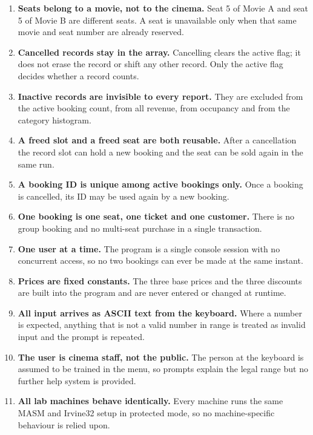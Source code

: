 \documentclass{thesis-library}
\begin{document}
\begin{enumerate}
\item \textbf{Seats belong to a movie, not to the cinema.} Seat 5 of Movie A and seat 5 of Movie B are different seats. A seat is unavailable only when that same movie and seat number are already reserved.
\item \textbf{Cancelled records stay in the array.} Cancelling clears the active flag; it does not erase the record or shift any other record. Only the active flag decides whether a record counts.
\item \textbf{Inactive records are invisible to every report.} They are excluded from the active booking count, from all revenue, from occupancy and from the category histogram.
\item \textbf{A freed slot and a freed seat are both reusable.} After a cancellation the record slot can hold a new booking and the seat can be sold again in the same run.
\item \textbf{A booking ID is unique among active bookings only.} Once a booking is cancelled, its ID may be used again by a new booking.
\item \textbf{One booking is one seat, one ticket and one customer.} There is no group booking and no multi-seat purchase in a single transaction.
\item \textbf{One user at a time.} The program is a single console session with no concurrent access, so no two bookings can ever be made at the same instant.
\item \textbf{Prices are fixed constants.} The three base prices and the three discounts are built into the program and are never entered or changed at runtime.
\item \textbf{All input arrives as ASCII text from the keyboard.} Where a number is expected, anything that is not a valid number in range is treated as invalid input and the prompt is repeated.
\item \textbf{The user is cinema staff, not the public.} The person at the keyboard is assumed to be trained in the menu, so prompts explain the legal range but no further help system is provided.
\item \textbf{All lab machines behave identically.} Every machine runs the same MASM and Irvine32 setup in protected mode, so no machine-specific behaviour is relied upon.
\end{enumerate}

\end{document}
